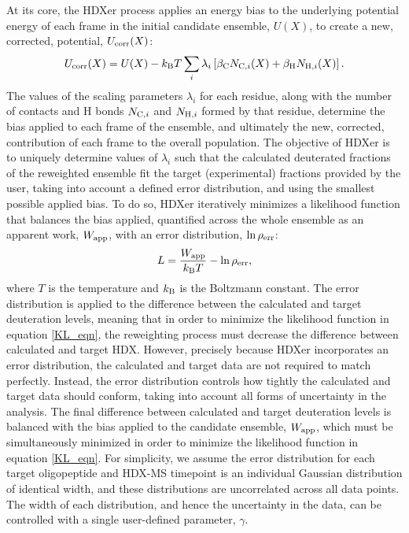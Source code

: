\documentclass[9pt,tutorial]{livecoms}
\begin{document}
At its core, the HDXer process applies an energy bias to the underlying potential energy of each frame in the initial candidate ensemble, $U(X)$, to create a new, corrected, potential, $U_{\textnormal{corr}}(X)$:
\begin{equation}\label{Ucorr_eqn}
    U_{\textnormal{corr}}(X) = U(X) -k_\textnormal{B}T\sum_{i} \lambda_i \left[ \beta_\textnormal{C} N_{\textnormal{C},i}(X) + \beta_\textnormal{H} N_{\textnormal{H},i}(X) \right].
\end{equation}
The values of the scaling parameters $\lambda_i$ for each residue, along with the number of contacts and H bonds $N_{\textnormal{C},i}$ and $N_{\textnormal{H},i}$ formed by that residue, determine the bias applied to each frame of the ensemble, and ultimately the new, corrected, contribution of each frame to the overall population.
The objective of HDXer is to uniquely determine values of $\lambda_i$ such that the calculated deuterated fractions of the reweighted ensemble fit the target (experimental) fractions provided by the user, taking into account a defined error distribution, and using the smallest possible applied bias.
To do so, HDXer iteratively minimizes a likelihood function that balances the bias applied, quantified across the whole ensemble as an apparent work, $W_\textnormal{app}$, with an error distribution, $\ln{\rho_\textnormal{err}}$:
\begin{equation}\label{KL_eqn}
    L = \frac{W_\textnormal{app}}{k_\textnormal{B}T} - \ln{\rho_\textnormal{err}},
\end{equation}
where $T$ is the temperature and $k_\textnormal{B}$ is the Boltzmann constant.
The error distribution is applied to the difference between the calculated and target deuteration levels, meaning that in order to minimize the likelihood function in equation \ref{KL_eqn}, the reweighting process must decrease the difference between calculated and target HDX.
However, precisely because HDXer incorporates an error distribution, the calculated and target data are not required to match perfectly.
Instead, the error distribution controls how tightly the calculated and target data should conform, taking into account all forms of uncertainty in the analysis.
The final difference between calculated and target deuteration levels is balanced with the bias applied to the candidate ensemble, $W_\textnormal{app}$, which must be simultaneously minimized in order to minimize the likelihood function in equation \ref{KL_eqn}. 
For simplicity, we assume the error distribution for each target oligopeptide and HDX-MS timepoint is an individual Gaussian distribution of identical width, and these distributions are uncorrelated across all data points.
The width of each distribution, and hence the uncertainty in the data, can be controlled with a single user-defined parameter, $\gamma$.
\end{document}
